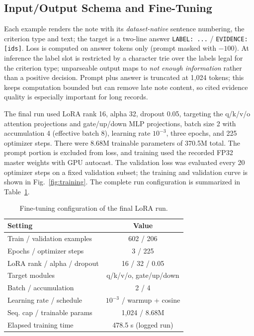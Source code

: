 \documentclass[conference]{IEEEtran}
\begin{document}
\subsection{Input/Output Schema and Fine-Tuning}
Each example renders the note with its \emph{dataset-native} sentence numbering, the
criterion type and text; the target is a two-line answer \texttt{LABEL: ...} /
\texttt{EVIDENCE: [ids]}. Loss is computed on answer tokens only (prompt masked with
$-100$). At inference the label slot is restricted by a character trie over the labels
legal for the criterion type; unparseable output maps to \emph{not enough information}
rather than a positive decision. Prompt plus answer is truncated at 1,024 tokens; this
keeps computation bounded but can remove late note content, so cited evidence quality
is especially important for long records.

The final run used LoRA rank 16, alpha 32, dropout 0.05, targeting the q/k/v/o attention
projections and gate/up/down MLP projections, batch size 2 with accumulation 4
(effective batch 8), learning rate $10^{-3}$,
three epochs, and 225 optimizer steps. There were 8.68M trainable parameters of
370.5M total. The prompt portion is excluded from loss, and training used the recorded
FP32 master weights with GPU autocast. The validation loss was evaluated every 20
optimizer steps on a fixed validation subset; the training and validation curve is
shown in Fig.~\ref{fig:training}.
The complete run configuration is summarized in Table~\ref{tab:training}.

\begin{table}[t]
\centering
\caption{Fine-tuning configuration of the final LoRA run.}
\label{tab:training}
\begin{tabular}{lc}
\toprule
Setting & Value \\
\midrule
Train / validation examples & 602 / 206 \\
Epochs / optimizer steps & 3 / 225 \\
LoRA rank / alpha / dropout & 16 / 32 / 0.05 \\
Target modules & q/k/v/o, gate/up/down \\
Batch / accumulation & 2 / 4 \\
Learning rate / schedule & $10^{-3}$ / warmup + cosine \\
Seq. cap / trainable params & 1,024 / 8.68M \\
Elapsed training time & 478.5 s (logged run) \\
\bottomrule
\end{tabular}
\end{table}
\end{document}
